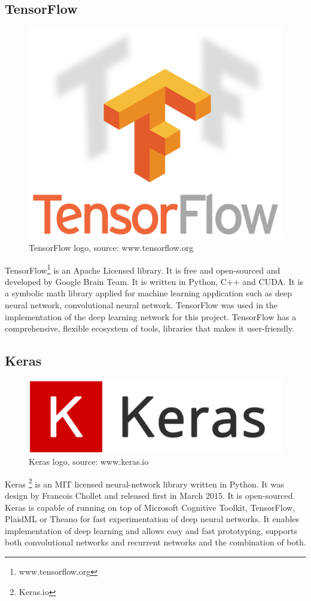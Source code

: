 \subsection{ TensorFlow}
\begin{figure}
    \centering
    \includegraphics[width=0.7\linewidth]{images/TensorFlow.png}
     \caption{TensorFlow logo, source: www.tensorflow.org}
  \end{figure}
TensorFlow\footnote{www.tensorflow.org} is an Apache Licensed library. It is free and open-sourced and developed by Google Brain Team. It is written in Python, C++ and CUDA. It is a symbolic math library applied for machine learning application such as deep neural network, convolutional neural network. TensorFlow was used in the implementation of the deep learning network for this project. TensorFlow has a comprehensive, flexible ecosystem of tools, libraries that makes it user-friendly.

\subsection{Keras}
\begin{figure}
    \centering
    \includegraphics[width=0.7\linewidth]{images/keras.png}
     \caption{Keras logo, source: www.keras.io}
  \end{figure}

Keras \footnote{Keras.io} is an MIT licensed neural-network library written in Python. It was design by Francois Chollet and released first in March 2015. It is open-sourced. Keras is capable of running on top of Microsoft Cognitive Toolkit, TensorFlow, PlaidML or Theano for fast experimentation of deep neural networks. It enables implementation of deep learning and allows easy and 
fast prototyping, supports both convolutional networks and recurrent networks and the combination of both.